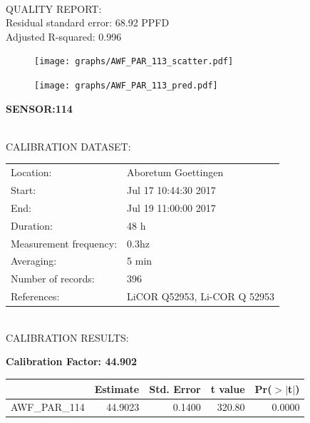 \documentclass[oneside]{report}
\begin{document}
\hrulefill\\
QUALITY REPORT:\\
Residual standard error: 68.92 PPFD\\
Adjusted R-squared: 0.996



\begin{figure}[H]
  \centering
  \texttt{[image: graphs/AWF\_PAR\_113\_scatter.pdf]}
\end{figure}




\begin{figure}[H]
  \centering
  \texttt{[image: graphs/AWF\_PAR\_113\_pred.pdf]}
\end{figure}

\pagebreak


\begin{center}
\large{\textbf{SENSOR:114}}\\
\end{center}

\hrulefill\\
CALIBRATION DATASET:\\
\begin{table}[h!]
  \centering
  \label{tab:table1}
  \begin{tabular}{ll}
    Location: & Aboretum Goettingen\\ 
    
    
    Start:  & Jul 17 10:44:30 2017 \\
    End:   & Jul 19 11:00:00 2017\\ 
    Duration: & 48 h\\
    Measurement frequency: & 0.3hz\\
    Averaging:  &5 min\\
    Number of records: & 396 \\
    References: & LiCOR Q52953, Li-COR Q 52953 \\
  \end{tabular}
\end{table}

\hrulefill\\
CALIBRATION RESULTS:\\


\begin{center}
\textbf{\large{Calibration Factor: 44.902}}\\
\end{center}
\begin{table}[ht]
\centering
\begin{tabular}{rrrrr}
  \hline
 & Estimate & Std. Error & t value & Pr($>$$|$t$|$) \\ 
  \hline
AWF\_PAR\_114 & 44.9023 & 0.1400 & 320.80 & 0.0000 \\ 
   \hline
\end{tabular}
\end{table}
\end{document}
